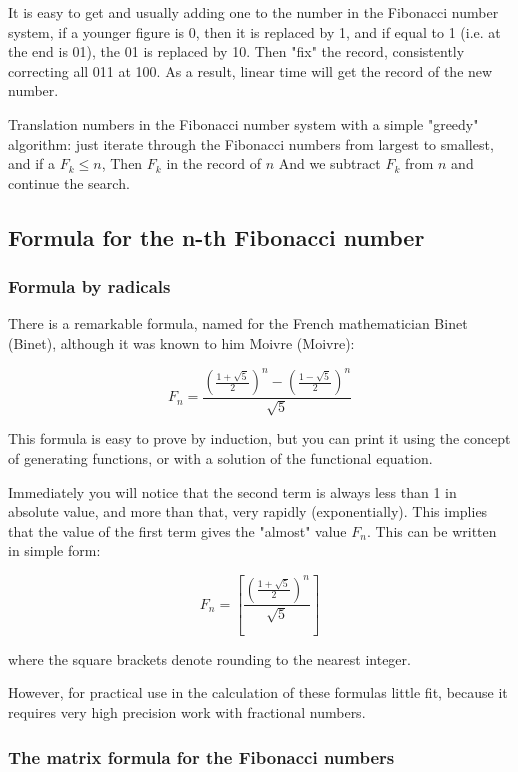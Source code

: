 It is easy to get and usually adding one to the number in the Fibonacci number system, if a younger figure is 0, then it is replaced by 1, and if equal to 1 (i.e. at the end is 01), the 01 is replaced by 10. Then "fix" the record, consistently correcting all 011 at 100. As a result, linear time will get the record of the new number.

Translation numbers in the Fibonacci number system with a simple "greedy" algorithm: just iterate through the Fibonacci numbers from largest to smallest, and if a $F_k \le n$, Then $F_k$ in the record of $n$ And we subtract $F_k$ from $n$ and continue the search.

\subsection{ Formula for the n-th Fibonacci number }

\subsubsection{ Formula by radicals }

There is a remarkable formula, named for the French mathematician Binet (Binet), although it was known to him Moivre (Moivre):

$$F_{n}=\frac{\left(\frac{1+\sqrt{5}}{2}\right)^{n}-\left(\frac{1-\sqrt{5}}{2}\right)^{n}}{\sqrt{5}}$$

This formula is easy to prove by induction, but you can print it using the concept of generating functions, or with a solution of the functional equation.

Immediately you will notice that the second term is always less than 1 in absolute value, and more than that, very rapidly (exponentially). This implies that the value of the first term gives the "almost" value $F_n$. This can be written in simple form:

$$F_{n}=\left[\frac{\left(\frac{1+\sqrt{5}}{2}\right)^{n}}{\sqrt{5}}\right]$$

where the square brackets denote rounding to the nearest integer.

However, for practical use in the calculation of these formulas little fit, because it requires very high precision work with fractional numbers.

\subsubsection{ The matrix formula for the Fibonacci numbers }

